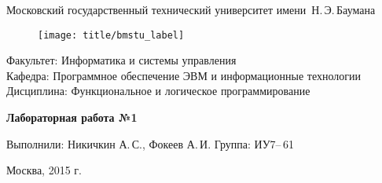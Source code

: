 
\thispagestyle{empty}

\begin{center}
	\Large
	Московский государственный технический университет имени~Н.\,Э.\,Баумана
\end{center}

\begin{figure}[h!]
	\begin{center}
		\texttt{[image: title/bmstu\_label]}
	\end{center}
\end{figure}

{\large
\noindent
Факультет: Информатика и системы управления\\[2mm]
\noindent
Кафедра: Программное обеспечение ЭВМ и информационные технологии\\[2mm]
\noindent
Дисциплина: Функциональное и логическое программирование
\vspace{1.5cm}}

\begin{center}
	\Large
	\textbf{Лабораторная работа №1}
\end{center}
\vfill

\hfill\begin{minipage}{0.6\textwidth}
	Выполнили: Никичкин А.\,С., Фокеев А.\,И.
	Группа: ИУ7--\,61

\end{minipage}
\vfill

\begin{center}
	Москва, 2015 г.
\end{center}